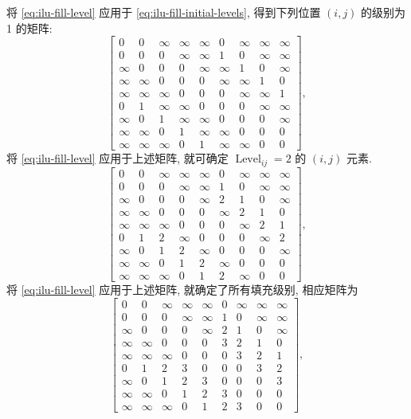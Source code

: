 {将 \eqref{eq:ilu-fill-level} 应用于 \eqref{eq:ilu-fill-initial-levels}, 得到下列位置 $(i,j)$ 的级别为 1 的矩阵:}
\[\begin{bmatrix}
0&0&\infty&\infty&\infty&0&\infty&\infty&\infty\\
0&0&0&\infty&\infty&1&0&\infty&\infty\\
\infty&0&0&0&\infty&\infty&1&0&\infty\\
\infty&\infty&0&0&0&\infty&\infty&1&0\\
\infty&\infty&\infty&0&0&0&\infty&\infty&1\\
0&1&\infty&\infty&0&0&0&\infty&\infty\\
\infty&0&1&\infty&\infty&0&0&0&\infty\\
\infty&\infty&0&1&\infty&\infty&0&0&0\\
\infty&\infty&\infty&0&1&\infty&\infty&0&0
\end{bmatrix},\]
{将 \eqref{eq:ilu-fill-level} 应用于上述矩阵, 就可确定 $\operatorname{Level}_{ij}=2$ 的 $(i,j)$ 元素.}
\[\begin{bmatrix}
0&0&\infty&\infty&\infty&0&\infty&\infty&\infty\\
0&0&0&\infty&\infty&1&0&\infty&\infty\\
\infty&0&0&0&\infty&2&1&0&\infty\\
\infty&\infty&0&0&0&\infty&2&1&0\\
\infty&\infty&\infty&0&0&0&\infty&2&1\\
0&1&2&\infty&0&0&0&\infty&2\\
\infty&0&1&2&\infty&0&0&0&\infty\\
\infty&\infty&0&1&2&\infty&0&0&0\\
\infty&\infty&\infty&0&1&2&\infty&0&0
\end{bmatrix},\]
{将 \eqref{eq:ilu-fill-level} 应用于上述矩阵, 就确定了所有填充级别, 相应矩阵为}
\begin{equation}\label{eq:ilu-fill-final-levels}\begin{bmatrix}
0&0&\infty&\infty&\infty&0&\infty&\infty&\infty\\
0&0&0&\infty&\infty&1&0&\infty&\infty\\
\infty&0&0&0&\infty&2&1&0&\infty\\
\infty&\infty&0&0&0&3&2&1&0\\
\infty&\infty&\infty&0&0&0&3&2&1\\
0&1&2&3&0&0&0&3&2\\
\infty&0&1&2&3&0&0&0&3\\
\infty&\infty&0&1&2&3&0&0&0\\
\infty&\infty&\infty&0&1&2&3&0&0
\end{bmatrix},\end{equation}
